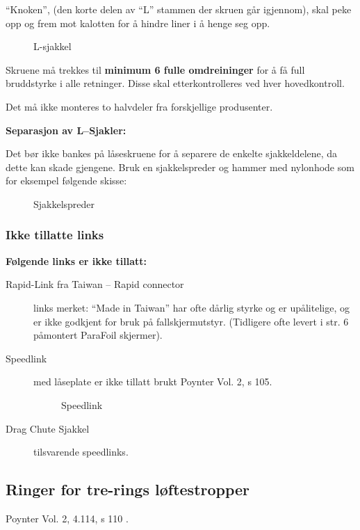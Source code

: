 ``Knoken'', (den korte delen av ``L'' stammen der skruen går igjennom), skal peke opp og frem mot kalotten for å hindre liner i å henge seg opp.

\begin{figure}
	\caption{L-sjakkel}
\end{figure}

Skruene må trekkes til \textbf{minimum 6 fulle omdreininger} for å få full bruddstyrke i alle retninger. Disse skal etterkontrolleres ved hver hovedkontroll.

Det må ikke monteres to halvdeler fra forskjellige produsenter.

\textbf{Separasjon av L–Sjakler:}

Det bør ikke bankes på låseskruene for å separere de enkelte sjakkeldelene, da dette kan skade gjengene. Bruk en sjakkelspreder og hammer med nylonhode som for eksempel følgende skisse:

\begin{figure}
	\caption{Sjakkelspreder}
\end{figure}

\subsubsection{Ikke tillatte links}
\textbf{Følgende links er ikke tillatt:}
\begin{description}
	\item[Rapid-Link fra Taiwan – Rapid connector] links merket: ``Made in Taiwan'' har ofte dårlig styrke og er upålitelige, og er ikke godkjent for bruk på fallskjermutstyr. (Tidligere ofte levert i str. 6 påmontert ParaFoil skjermer).
	\item[Speedlink] med låseplate er ikke tillatt brukt Poynter Vol. 2, s 105.
	\begin{figure}
		\caption{Speedlink}
	\end{figure}

	\item[Drag Chute Sjakkel] tilsvarende speedlinks.
\end{description}

\subsection{Ringer for tre-rings løftestropper}
Poynter Vol. 2, 4.114, s 110 .

